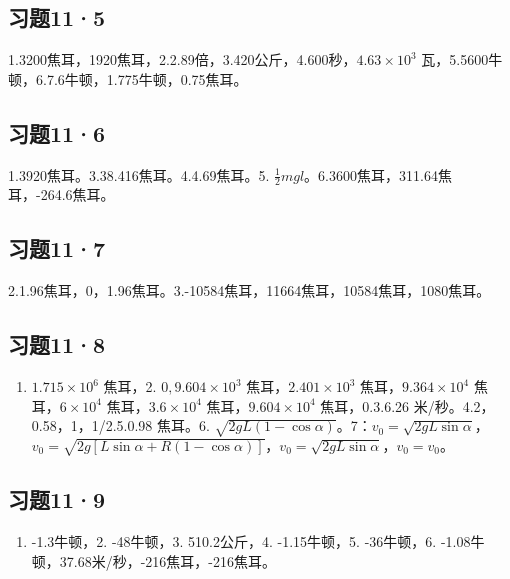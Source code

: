 \subsection{习题11·5}\label{ux4e60ux9898115-1}

1.3200焦耳，1920焦耳，2.2.89倍，3.420公斤，4.600秒，\(4.63\times10^{3}\)
瓦，5.5600牛顿，6.7.6牛顿，1.775牛顿，0.75焦耳。

\subsection{习题11·6}\label{ux4e60ux9898116-1}

1.3920焦耳。3.38.416焦耳。4.4.69焦耳。5.
\(\frac{1}{2} mgl\)。6.3600焦耳，311.64焦耳，-264.6焦耳。

\subsection{习题11·7}\label{ux4e60ux9898117-1}

2.1.96焦耳，0，1.96焦耳。3.-10584焦耳，11664焦耳，10584焦耳，1080焦耳。

\subsection{习题11·8}\label{ux4e60ux9898118-1}

\begin{enumerate}
\def\labelenumi{\arabic{enumi}.}
\tightlist
\item
  \(1.715 \times 10^{6}\) 焦耳，2. \(0, 9.604 \times 10^{3}\)
  焦耳，\(2.401 \times 10^{3}\) 焦耳，\(9.364 \times 10^{4}\)
  焦耳，\(6 \times 10^{4}\) 焦耳，\(3.6 \times 10^{4}\)
  焦耳，\(9.604 \times 10^{4}\) 焦耳，0.3.6.26
  米/秒。4.2，0.58，1，1/2.5.0.98 焦耳。6.
  \(\sqrt{2gL(1-\cos\alpha)}\)。7：\(v_{0} = \sqrt{2gL\sin\alpha}\)，\(v_{0} = \sqrt{2g[L\sin\alpha + R(1-\cos\alpha)]}\)，\(v_{0} = \sqrt{2gL\sin\alpha}\)，\(v_{0} = v_{0}\)。
\end{enumerate}

\subsection{习题11·9}\label{ux4e60ux9898119-1}

\begin{enumerate}
\def\labelenumi{\arabic{enumi}.}
\tightlist
\item
  -1.3牛顿，2. -48牛顿，3. 510.2公斤，4. -1.15牛顿，5. -36牛顿，6.
  -1.08牛顿，37.68米/秒，-216焦耳，-216焦耳。
\end{enumerate}

